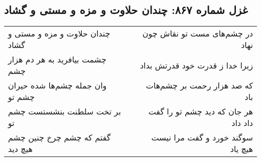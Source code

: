\begin{center}
\section*{غزل شماره ۸۶۷: چندان حلاوت و مزه و مستی و گشاد}
\label{sec:0867}
\begin{longtable}{l p{0.5cm} r}
چندان حلاوت و مزه و مستی و گشاد
&&
در چشم‌های مست تو نقاش چون نهاد
\\
چشمت بیافرید به هر دم هزار چشم
&&
زیرا خدا ز قدرت خود قدرتش بداد
\\
وان جمله چشم‌ها شده حیران چشم تو
&&
که صد هزار رحمت بر چشم‌هات باد
\\
بر تخت سلطنت بنشستست چشم تو
&&
هر جان که دید چشم تو را گفت داد داد
\\
گفتم که چشم چرخ چنین چشم هیچ دید
&&
سوگند خورد و گفت مرا نیست هیچ یاد
\\
\end{longtable}
\end{center}
